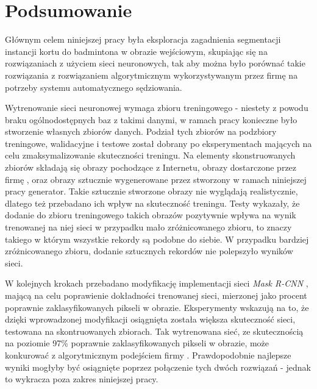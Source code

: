 \chapter{Podsumowanie}

Głównym celem niniejszej pracy była eksploracja zagadnienia segmentacji instancji kortu do badmintona w obrazie wejściowym, skupiając się na rozwiązaniach z użyciem sieci neuronowych, tak aby można było porównać takie rozwiązania z rozwiązaniem algorytmicznym wykorzystywanym przez firmę \blue{} na potrzeby systemu automatycznego sędziowania.

Wytrenowanie sieci neuronowej wymaga zbioru treningowego - niestety z powodu braku ogólnodostępnych baz z takimi danymi, w ramach pracy konieczne było stworzenie własnych zbiorów danych. Podział tych zbiorów na podzbiory treningowe, walidacyjne i testowe został dobrany po eksperymentach mających na celu zmaksymalizowanie skuteczności treningu. Na elementy skonstruowanych zbiorów składają się obrazy pochodzące z Internetu, obrazy dostarczone przez firmę \blue{}, oraz obrazy sztucznie wygenerowane przez stworzony w ramach niniejszej pracy generator. Takie sztucznie stworzone obrazy nie wyglądają realistycznie, dlatego też przebadano ich wpływ na skuteczność treningu. Testy wykazały, że dodanie do zbioru treningowego takich obrazów pozytywnie wpływa na wynik trenowanej na niej sieci w przypadku mało zróżnicowanego zbioru, to znaczy takiego w którym wszystkie rekordy są podobne do siebie. W przypadku bardziej zróżnicowanego zbioru, dodanie sztucznych rekordów nie polepszyło wyników sieci.

W kolejnych krokach przebadano modyfikację implementacji sieci \textit{Mask R-CNN} \cite{matterport-mask-rcnn}, mającą na celu poprawienie dokładności trenowanej sieci, mierzonej jako procent poprawnie zaklasyfikowanych pikseli w obrazie. Eksperymenty wskazują na to, że dzięki wprowadzonej modyfikacji osiągnięta została większa skuteczność sieci, testowana na skontruowanych zbiorach. Tak wytrenowana sieć, ze skutecznością na poziomie 97\% poprawnie zaklasyfikowanych pikseli w obrazie, może konkurować z algorytmicznym podejściem firmy \blue{}. Prawdopodobnie najlepsze wyniki mogłyby być osiągnięte poprzez połączenie tych dwóch rozwiązań - jednak to wykracza poza zakres niniejszej pracy.

